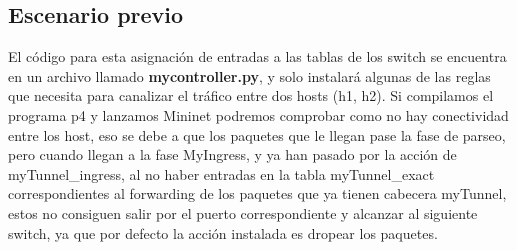 \subsection{Escenario previo}

El código para esta asignación de entradas a las tablas de los switch se encuentra en un archivo llamado \textbf{mycontroller.py}, y solo instalará algunas de las reglas que necesita para canalizar el tráfico entre dos hosts (h1, h2). \newline
\newline
Si compilamos el programa p4 y lanzamos Mininet podremos comprobar como  no hay conectividad entre los host, eso se debe a que los paquetes que le llegan pase la fase de parseo, pero cuando llegan a la fase MyIngress, y ya han pasado por la acción de myTunnel\_ingress, al no haber entradas en la tabla myTunnel\_exact correspondientes al forwarding de los paquetes que ya tienen cabecera myTunnel, estos no consiguen salir por el puerto correspondiente y alcanzar al siguiente switch, ya que por defecto la acción instalada es dropear los paquetes.\newline
\newline

